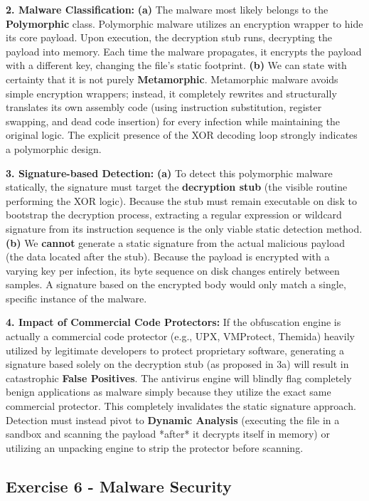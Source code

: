 \documentclass{article}
\begin{document}
\textbf{2. Malware Classification:}
\textbf{(a)} The malware most likely belongs to the \textbf{Polymorphic} class. Polymorphic malware utilizes an encryption wrapper to hide its core payload. Upon execution, the decryption stub runs, decrypting the payload into memory. Each time the malware propagates, it encrypts the payload with a different key, changing the file's static footprint.
\textbf{(b)} We can state with certainty that it is not purely \textbf{Metamorphic}. Metamorphic malware avoids simple encryption wrappers; instead, it completely rewrites and structurally translates its own assembly code (using instruction substitution, register swapping, and dead code insertion) for every infection while maintaining the original logic. The explicit presence of the XOR decoding loop strongly indicates a polymorphic design.

\textbf{3. Signature-based Detection:}
\textbf{(a)} To detect this polymorphic malware statically, the signature must target the \textbf{decryption stub} (the visible routine performing the XOR logic). Because the stub must remain executable on disk to bootstrap the decryption process, extracting a regular expression or wildcard signature from its instruction sequence is the only viable static detection method.
\textbf{(b)} We \textbf{cannot} generate a static signature from the actual malicious payload (the data located after the stub). Because the payload is encrypted with a varying key per infection, its byte sequence on disk changes entirely between samples. A signature based on the encrypted body would only match a single, specific instance of the malware.

\textbf{4. Impact of Commercial Code Protectors:}
If the obfuscation engine is actually a commercial code protector (e.g., UPX, VMProtect, Themida) heavily utilized by legitimate developers to protect proprietary software, generating a signature based solely on the decryption stub (as proposed in 3a) will result in catastrophic \textbf{False Positives}. The antivirus engine will blindly flag completely benign applications as malware simply because they utilize the exact same commercial protector. This completely invalidates the static signature approach. Detection must instead pivot to \textbf{Dynamic Analysis} (executing the file in a sandbox and scanning the payload *after* it decrypts itself in memory) or utilizing an unpacking engine to strip the protector before scanning.

\subsection{Exercise 6 - Malware Security}
\end{document}
